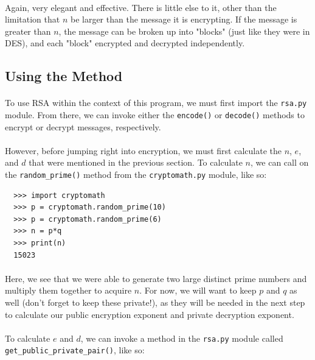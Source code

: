 \documentclass[12pt,a4paper]{article}
\begin{document}
\paragraph{}
Again, very elegant and effective.  There is little else to it, other than the 
limitation that $n$ be larger than the message it is encrypting.  If the 
message is greater than $n$, the message can be broken up into "blocks" (just 
like they were in DES), and each "block" encrypted and decrypted independently.

\subsection{Using the Method}
\paragraph{}
To use RSA within the context of this program, we must first import the 
\verb|rsa.py| module.  From there, we can invoke either the \verb|encode()| or 
\verb|decode()| methods to encrypt or decrypt messages, respectively.

\paragraph{}
However, before jumping right into encryption, we must first calculate the $n$, 
$e$, and $d$ that were mentioned in the previous section.  To calculate $n$, we 
can call on the \verb|random_prime()| method from the \verb|cryptomath.py| 
module, like so:

\begin{verbatim}
  >>> import cryptomath
  >>> p = cryptomath.random_prime(10) 
  >>> p = cryptomath.random_prime(6)  
  >>> n = p*q    
  >>> print(n)
  15023
\end{verbatim}

\paragraph{}
Here, we see that we were able to generate two large distinct prime numbers and 
multiply them together to acquire $n$.  For now, we will want to keep $p$ and 
$q$ as well (don't forget to keep these private!), as they will be needed in 
the next step to calculate our public encryption exponent and private 
decryption exponent.

\paragraph{}
To calculate $e$ and $d$, we can invoke a method in the \verb|rsa.py| module 
called \verb|get_public_private_pair()|, like so:
\end{document}
